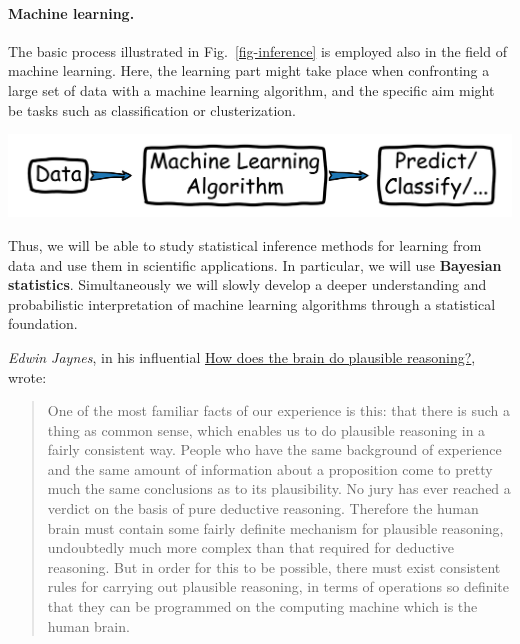 \documentclass[%
oneside,                 %
final,                   %
10pt]{article}
\begin{document}
\paragraph{Machine learning.}
The basic process illustrated in Fig.~\ref{fig-inference} is employed also in the field of machine learning. Here, the learning part might take place when confronting a large set of data with a machine learning algorithm, and the specific aim might be tasks such as classification or clusterization. 


\vspace{6mm}

\centerline{\includegraphics[width=0.8\linewidth]{fig/MLinference.png}}

\vspace{6mm}



Thus, we will be able to study statistical inference methods for learning from data and use them in scientific applications. In particular, we will use \textbf{Bayesian statistics}. Simultaneously we will slowly develop a deeper understanding and probabilistic interpretation of machine learning algorithms through a statistical foundation. 

\emph{Edwin Jaynes}, in his influential \href{{https://link.springer.com/chapter/10.1007%2F978-94-009-3049-0_1}}{How does the brain do plausible reasoning?}, wrote:

\begin{quote}
One of the most familiar facts of our experience is this: that there is such a thing as common sense, which enables us to do plausible reasoning in a fairly consistent way. People who have the same background of experience and the same amount of information about a proposition come to pretty much the same conclusions as to its plausibility. No jury has ever reached a verdict on the basis of pure deductive reasoning. Therefore the human brain must contain some fairly definite mechanism for plausible reasoning, undoubtedly much more complex than that required for deductive reasoning. But in order for this to be possible, there must exist consistent rules for carrying out plausible reasoning, in terms of operations so definite that they can be programmed on the computing machine which is the human brain.
\end{quote}
\end{document}
